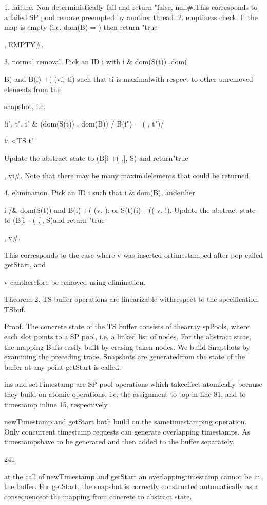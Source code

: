 1. failure. Non-deterministically fail and return "false, null#.This corresponds to a failed SP pool remove preempted by another thread.
2. emptiness check. If the map is empty (i.e. dom(B) =-) then return "true

, EMPTY#.

3. normal removal. Pick an ID i with i & dom(S(t)) .dom(

B) and B(i) +( (vi, ti) such that ti is maximalwith respect to other unremoved elements from the

snapshot, i.e.

!i", t". i" & (dom(S(t)) . dom(B)) / B(i") = ( , t")/

ti <TS t"

Update the abstract state to (B[i +( ,], S) and return"true

, vi#. Note that there may be many maximalelements that could be returned.

4. elimination. Pick an ID i such that i & dom(B), andeither

i /& dom(S(t)) and B(i) +( (v, ); or S(t)(i) +((
v, !). Update the abstract state to (B[i +( ,], S)and return "true

, v#.

This corresponds to the case where v was inserted ortimestamped after pop called getStart, and

v cantherefore be removed using elimination.

Theorem 2. TS buffer operations are linearizable withrespect to the specification TSbuf.

Proof. The concrete state of the TS buffer consists of thearray spPools, where each slot points to a SP pool, i.e. a
linked list of nodes. For the abstract state, the mapping Bufis easily built by erasing taken nodes. We build Snapshots
by examining the preceding trace. Snapshots are generatedfrom the state of the buffer at any point getStart is called.

ins and setTimestamp are SP pool operations which takeeffect atomically because they build on atomic operations,
i.e. the assignment to top in line 81, and to timestamp inline 15, respectively.

newTimestamp and getStart both build on the sametimestamping operation. Only concurrent timestamp requests can generate overlapping timestamps. As timestampshave to be generated and then added to the buffer separately,

241

at the call of newTimestamp and getStart an overlappingtimestamp cannot be in the buffer. For getStart, the snapshot is correctly constructed automatically as a consequenceof the mapping from concrete to abstract state.


